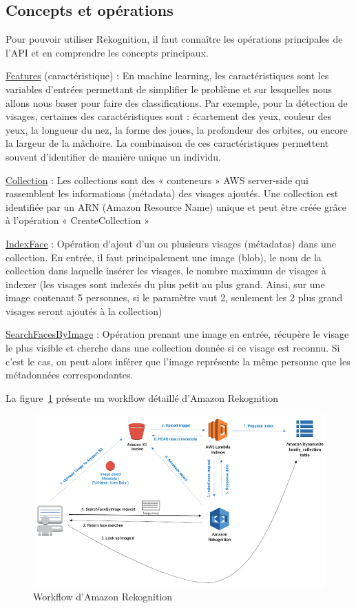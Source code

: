 \subsection{Concepts et opérations}
Pour pouvoir utiliser Rekognition, il faut connaître les opérations principales de l’API et en comprendre les concepts
principaux.

\underline{Features} (caractéristique) : En machine learning, les caractéristiques sont les variables d’entrées permettant de
simplifier le problème et sur lesquelles nous allons nous baser pour faire des classifications. Par exemple, pour la
détection de visages, certaines des caractéristiques sont : écartement des yeux, couleur des yeux, la longueur du
nez, la forme des joues, la profondeur des orbites, ou encore la largeur de la mâchoire. La combinaison de ces
caractéristiques permettent souvent d’identifier de manière unique un individu.

\underline{Collection} : Les collections sont des « conteneurs » AWS server-side qui rassemblent les informations (métadata)
des visages ajoutés. Une collection est identifiée par un ARN (Amazon Resource Name) unique et peut être créée
grâce à l’opération « CreateCollection »

\underline{IndexFace} : Opération d’ajout d’un ou plusieurs visages (métadatas) dans une collection. En entrée, il faut
principalement une image (blob), le nom de la collection dans laquelle insérer les visages, le nombre maximum de
visages à indexer (les visages sont indexés du plus petit au plus grand. Ainsi, sur une image contenant 5 personnes,
si le paramètre vaut 2, seulement les 2 plus grand visages seront ajoutés à la collection)

\underline{SearchFacesByImage}\label{text:SearchFacesByImage} : Opération prenant une image en entrée, récupère le visage le plus visible et cherche dans
une collection donnée si ce visage est reconnu. Si c’est le cas, on peut alors inférer que l’image représente la même
personne que les métadonnées correspondantes.

La figure~\ref{fig:reko-workflow} présente un workflow détaillé d’Amazon Rekognition

\begin{figure}[H]
	\centering
	\includegraphics[width=12cm]{images/proto-6.png}
	\caption{Workflow d'Amazon Rekognition}
	\label{fig:reko-workflow}
\end{figure}

